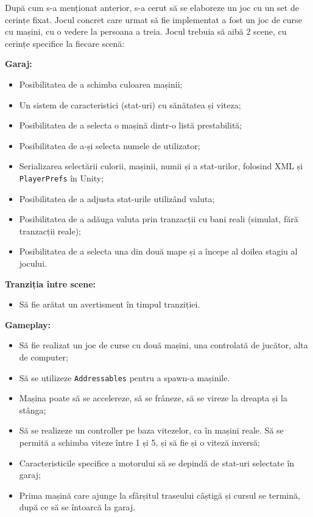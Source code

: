 \documentclass[a4paper,12pt]{report}
\begin{document}
După cum s-a menționat anterior, s-a cerut să se elaboreze un joc cu un set de cerințe fixat.
Jocul concret care urmat să fie implementat a fost un joc de curse cu mașini, cu o vedere la persoana a treia.
Jocul trebuia să aibă 2 scene, cu cerințe specifice la fiecare scenă:

\textbf{Garaj:}
\begin{itemize}
  \item Posibilitatea de a schimba culoarea mașinii;
  \item Un sistem de caracteristici (stat-uri) cu sănătatea și viteza;
  \item Posibilitatea de a selecta o mașină dintr-o listă prestabilită;
  \item Posibilitatea de a-și selecta numele de utilizator;
  \item Serializarea selectării culorii, mașinii, numii și a stat-urilor, folosind \ac{XML} și \texttt{PlayerPrefs} în Unity;
  \item Posibilitatea de a adjusta stat-urile utilizând valuta;
  \item Posibilitatea de a adăuga valuta prin tranzacții cu bani reali (simulat, fără tranzacții reale);
  \item Posibilitatea de a selecta una din două mape și a începe al doilea stagiu al jocului.
\end{itemize}

\textbf{Tranziția între scene:}
\begin{itemize}
  \item Să fie arătat un avertisment în timpul tranziției.
\end{itemize}

\textbf{Gameplay:}
\begin{itemize}
  \item Să fie realizat un joc de curse cu două mașini, una controlată de jucător, alta de computer;
  \item Să se utilizeze \texttt{Addressables} pentru a spawn-a mașinile.
  \item Mașina poate să se accelereze, să se frâneze, să se vireze la dreapta și la stânga;
  \item Să se realizeze un controller pe baza vitezelor, ca în mașini reale. Să se permită a schimba viteze între 1 și 5, și să fie și o viteză inversă;
  \item Caracteristicile specifice a motorului să se depindă de stat-uri selectate în garaj;
  \item Prima mașină care ajunge la sfârșitul traseului câștigă și cursul se termină, după ce să se întoarcă la garaj.
\end{itemize}
\end{document}
